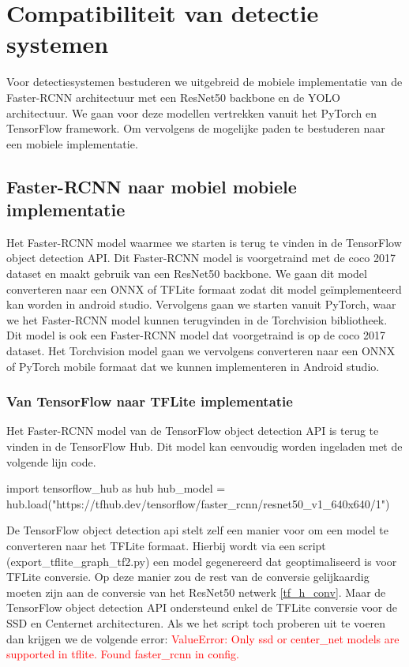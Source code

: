 \chapter{Compatibiliteit van detectie systemen}
Voor detectiesystemen bestuderen we uitgebreid de mobiele implementatie van de Faster-RCNN architectuur met een ResNet50 backbone en de YOLO architectuur.
We gaan voor deze modellen vertrekken vanuit het PyTorch en TensorFlow framework.
Om vervolgens de mogelijke paden te bestuderen naar een mobiele implementatie.

\section{Faster-RCNN naar mobiel mobiele implementatie}
Het Faster-RCNN model waarmee we starten is terug te vinden in de TensorFlow object detection API.
Dit Faster-RCNN model is voorgetraind met de coco 2017 dataset en maakt gebruik van een ResNet50 backbone.
We gaan dit model converteren naar een ONNX of TFLite formaat zodat dit model ge\"implementeerd kan worden in android studio.
Vervolgens gaan we starten vanuit PyTorch, waar we het Faster-RCNN model kunnen terugvinden in de Torchvision bibliotheek.
Dit model is ook een Faster-RCNN model dat voorgetraind is op de coco 2017 dataset.
Het Torchvision model gaan we vervolgens converteren naar een ONNX of PyTorch mobile formaat dat we kunnen implementeren in Android studio.

\subsection{Van TensorFlow naar TFLite implementatie} \label{rcnn_tf}
Het Faster-RCNN model van de TensorFlow object detection API is terug te vinden in de TensorFlow Hub.
Dit model kan eenvoudig worden ingeladen met de volgende lijn code.

\begin{python}
import tensorflow_hub as hub
hub_model = hub.load("https://tfhub.dev/tensorflow/faster_rcnn/resnet50_v1_640x640/1")
\end{python}

De TensorFlow object detection api stelt zelf een manier voor om een model te converteren naar het TFLite formaat.
Hierbij wordt via een script (export\_tflite\_graph\_tf2.py) een model gegenereerd dat geoptimaliseerd is voor TFLite conversie.
Op deze manier zou de rest van de conversie gelijkaardig moeten zijn aan de conversie van het ResNet50 netwerk \ref{tf_h_conv}.
Maar de TensorFlow object detection API ondersteund enkel de TFLite conversie voor de SSD en Centernet architecturen.
Als we het script toch proberen uit te voeren dan krijgen we de volgende error: 
\textcolor{red}{ValueError: Only ssd or center\_net models are supported in tflite. Found faster\_rcnn in config.}

